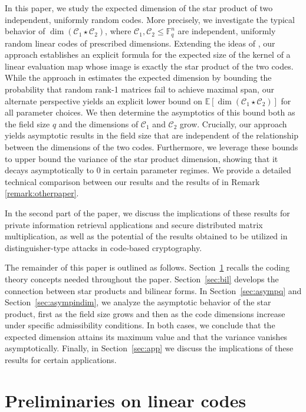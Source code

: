 \documentclass[a4paper,11pt,reqno]{article}
\theoremstyle{plain} \numberwithin{equation}{section}
\theoremstyle{definition}
\begin{document}
{ 
In this paper, we study the expected dimension of the star product of two independent, uniformly random codes. More precisely, we investigate the typical behavior of $\dim (\mathcal{C}_1\star\mathcal{C}_2)$, where $\mathcal{C}_1,\mathcal{C}_2\leq \mathbb{F}_q^n$ are independent, uniformly random linear codes of prescribed dimensions. Extending the ideas of \cite{cascudo2015squares}, our approach establishes an explicit formula for the expected size of the kernel of a linear evaluation map whose image is exactly the star product of the two codes. While the approach in \cite{7282444} estimates the expected dimension by bounding the probability that random rank-1 matrices fail to achieve maximal span, our alternate perspective yields an explicit lower bound on $\mathbb{E}[\dim (\mathcal{C}_1\star\mathcal{C}_2)]$ for all parameter choices. We then determine the asymptotics of this bound both as the field size $q$ and the dimensions of $\mathcal{C}_1$ and $\mathcal{C}_2$ grow. Crucially, our approach yields asymptotic results in the field size that are independent of the relationship between the dimensions of the two codes. Furthermore, we leverage these bounds to upper bound the variance of the star product dimension, showing that it decays asymptotically to $0$ in certain parameter regimes. We provide a detailed technical comparison between our results and the results of \cite{7282444} in Remark \ref{remark:otherpaper}.
}

In the second part of the paper, we discuss the implications of these results for private information retrieval applications and secure distributed matrix multiplication, as well as the potential of the results obtained to be utilized in distinguisher-type attacks in code-based cryptography.

The remainder of this paper is outlined as follows. Section~\ref{sec:prelim} recalls the coding theory concepts needed throughout the paper. Section~\ref{sec:bil} develops the connection between star products and bilinear forms. In Section~\ref{sec:asympq} and Section~\ref{sec:asympindim}, we analyze the asymptotic behavior of the star product, first as the field size grows and then as the code dimensions increase under specific admissibility conditions. In both cases, we conclude that the expected dimension attains its maximum value and that the variance vanishes asymptotically. Finally, in Section~\ref{sec:app} we discuss the implications of these results for certain applications.


\section{Preliminaries on linear codes}
\label{sec:prelim}
\end{document}
